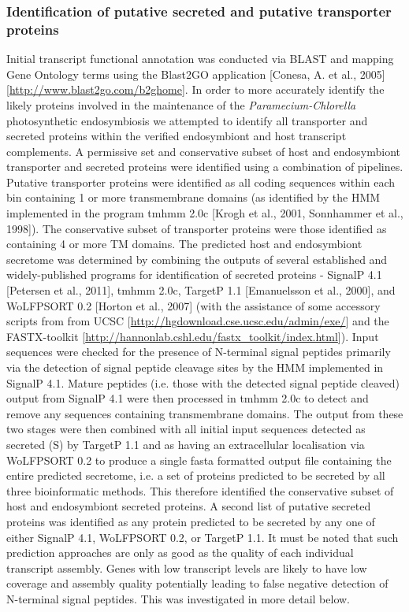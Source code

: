 \documentclass[a4paper,11pt]{article}
\begin{document}
\subsubsection{Identification of putative secreted and putative transporter proteins}
Initial transcript functional annotation was conducted via BLAST and mapping Gene Ontology terms using the Blast2GO application [Conesa, A. et al., 2005] [\url{http://www.blast2go.com/b2ghome}].  
In order to more accurately identify the likely proteins involved in the maintenance of the \textit{Paramecium-Chlorella} photosynthetic endosymbiosis we attempted to identify all transporter and secreted proteins within the verified endosymbiont and host transcript complements. A permissive set and conservative subset of host and endosymbiont transporter and secreted proteins were identified using a combination of pipelines.
 Putative transporter proteins were identified as all coding sequences within each bin containing 1 or more transmembrane domains (as identified by the HMM implemented in the program tmhmm 2.0c  [Krogh et al., 2001, Sonnhammer et al., 1998]).  
The conservative subset of transporter proteins were those identified as containing 4 or more TM domains.  
The predicted host and endosymbiont secretome was determined by combining the outputs of several established and widely-published programs for identification of secreted proteins - SignalP 4.1 [Petersen et al., 2011], tmhmm 2.0c, TargetP 1.1 [Emanuelsson et al., 2000], and WoLFPSORT 0.2 [Horton et al., 2007] (with the assistance of some accessory scripts from from UCSC [\url{http://hgdownload.cse.ucsc.edu/admin/exe/}] and the FASTX-toolkit [\url{http://hannonlab.cshl.edu/fastx_toolkit/index.html}]). 
Input sequences were checked for the presence of N-terminal signal peptides primarily via the detection of signal peptide cleavage sites by the HMM implemented in SignalP 4.1. 
Mature peptides (i.e. those with the detected signal peptide cleaved) output from SignalP 4.1 were then processed in tmhmm 2.0c to detect and remove any sequences containing transmembrane domains. 
The output from these two stages were then combined with all initial input sequences detected as secreted (S) by TargetP 1.1 and as having an extracellular localisation via WoLFPSORT 0.2 to produce a single fasta formatted output file containing the entire predicted secretome, i.e. a set of proteins predicted to be secreted by all three bioinformatic methods. 
This therefore identified the conservative subset of host and endosymbiont secreted proteins. 
A second list of putative secreted proteins was identified as any protein predicted to be secreted by any one of either SignalP 4.1, WoLFPSORT 0.2, or TargetP 1.1. It must be noted that such prediction approaches are only as good as the quality of each individual transcript assembly. 
Genes with low transcript levels are likely to have low coverage and assembly quality potentially leading to false negative detection of N-terminal signal peptides. 
This was investigated in more detail below.
\end{document}
